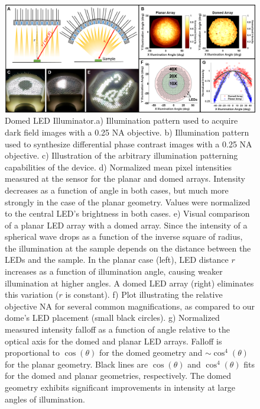\begin{figure} [ht]
\begin{center}
\includegraphics[width=\textwidth]{figures/fig_ccs_dome.png}
\end{center}
\caption {{ Domed LED Illuminator.}{a)} Illumination pattern used to acquire dark field images with a 0.25 NA objective.
{b)} Illumination pattern used to synthesize differential phase contrast images with a 0.25 NA objective.
{c)} Illustration of the arbitrary illumination patterning capabilities of the device.
{d)} Normalized mean pixel intensities measured at the sensor for the planar and domed arrays. Intensity decreases as a function of angle in both cases, but much more strongly in the case of the planar geometry. Values were normalized to the central LED's brightness in both cases.
{e)} Visual comparison of a planar LED array with a domed array. Since the intensity of a spherical wave drops as a function of the inverse square of radius, the illumination at the sample depends on the distance between the LEDs and the sample. In the planar case (left), LED distance $r$ increases as a function of illumination angle, causing weaker illumination at higher angles. A domed LED array (right) eliminates this variation ($r$ is constant).
{f)} Plot illustrating the relative objective NA for several common magnifications, as compared to our dome's LED placement (small black circles).
{g)} Normalized measured intensity falloff as a function of angle relative to the optical axis for the domed and planar LED arrays. Falloff is proportional to $\cos(\theta)$ for the domed geometry and $\sim\cos^4(\theta)$ for the planar geometry. Black lines are $\cos(\theta)$ and $\cos^4(\theta)$ fits for the domed and planar geometries, respectively. The domed geometry exhibits significant improvements in intensity at large angles of illumination.
}
\label{fig:fabrication_ccs_dome}
\end{figure}

